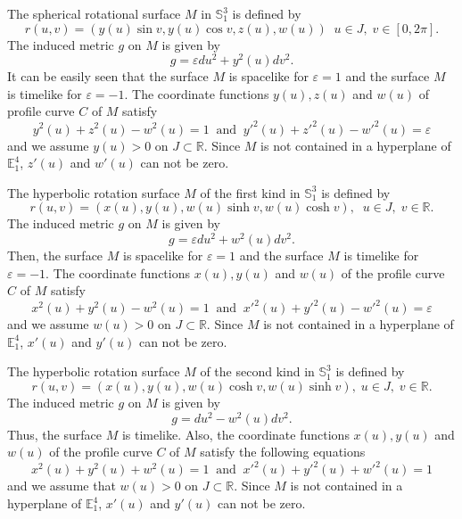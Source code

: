 \documentclass{amsart}
\theoremstyle{definition}
\numberwithin{equation}{section}
\begin{document}
The spherical rotational surface $M$ in $\mathbb{S}^3_1$ 
is defined by 
\begin{equation}
\label{sphr}
    r(u,v)=(y(u)\sin{v},y(u)\cos{v},z(u),w(u))\;\;
    u\in J,\;v\in[0,2\pi].
\end{equation}
The induced metric $g$ on $M$ is given by 
\begin{equation}
    g=\varepsilon du^2+y^2(u)dv^2.
\end{equation}
It can be easily seen that the surface $M$ is spacelike 
for $\varepsilon=1$ and the surface $M$ is timelike
for $\varepsilon=-1$. 
The coordinate functions $y(u), z(u)$ and $w(u)$ of profile curve $C$ of $M$ satisfy
\begin{equation}
    y^2(u)+z^2(u)-w^2(u)=1\;\;\mbox{and}\;\;
    y'^2(u)+z'^2(u)-w'^2(u)=\varepsilon
\end{equation}
and we assume $y(u)>0$ on $J\subset\mathbb{R}$. 
Since $M$ is not contained in a hyperplane of $\mathbb{E}^4_1$, $z'(u)$ and $w'(u)$ can not be zero. 

The hyperbolic rotation surface $M$ of the first kind in $\mathbb{S}^3_1$ is defined by
\begin{equation}
\label{hyp1}
    r(u,v)=(x(u),y(u),w(u)\sinh{v},w(u)\cosh{v}),\;\;
    u\in J,\; v\in\mathbb{R}.
\end{equation}
The induced metric 
$g$ on $M$ is given by 
\begin{equation}
    g=\varepsilon du^2+w^2(u)dv^2.
\end{equation}
Then, the surface $M$ is spacelike for $\varepsilon=1$ 
and the surface $M$ is timelike for $\varepsilon=-1$. 
The coordinate functions $x(u), y(u)$ and $w(u)$ of the profile curve $C$ of $M$ satisfy
\begin{equation}
   x^2(u)+y^2(u)-w^2(u)=1\;\;\mbox{and}\;\;
    x'^2(u)+y'^2(u)-w'^2(u)=\varepsilon
\end{equation}
and we assume $w(u)>0$ on $J\subset\mathbb{R}$. 
Since $M$ is not contained in a hyperplane of $\mathbb{E}^4_1$, $x'(u)$ and $y'(u)$ can not be zero.

The hyperbolic rotation surface $M$ of the second kind in $\mathbb{S}^3_1$ is defined by
\begin{equation}
\label{hyp2}
    r(u,v)=(x(u),y(u),w(u)\cosh{v},w(u)\sinh{v}),\;
    u\in J,\; v\in\mathbb{R}.
\end{equation}
The induced metric $g$ on $M$ is given by 
\begin{equation}
    g=du^2-w^2(u)dv^2.
\end{equation}
Thus, the surface $M$ is timelike. 
Also, the coordinate functions $x(u), y(u)$ and $w(u)$ of the profile curve $C$ of $M$ satisfy the following equations
\begin{equation}
   x^2(u)+y^2(u)+w^2(u)=1\;\;\mbox{and}\;\;
    x'^2(u)+y'^2(u)+w'^2(u)=1
\end{equation}
and we assume that $w(u)>0$ on $J\subset\mathbb{R}$. 
Since $M$ is not contained in a hyperplane of $\mathbb{E}^4_1$, $x'(u)$ and $y'(u)$ can not be zero.
\end{document}
